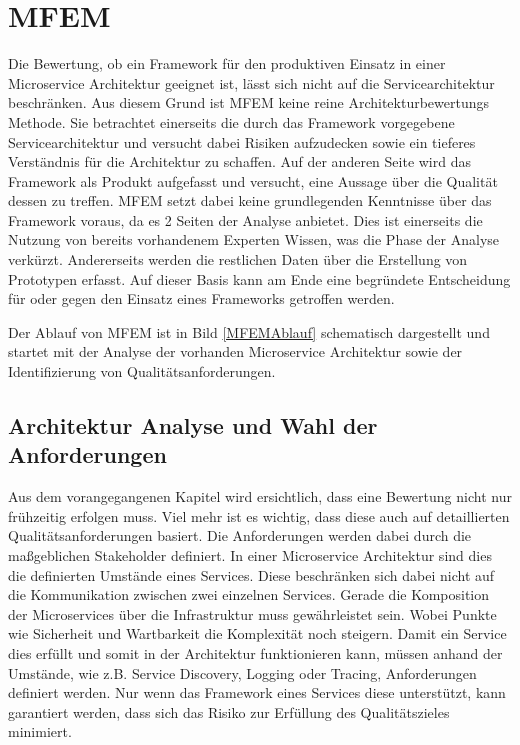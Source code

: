\section{\acf{MFEM}}

Die Bewertung, ob ein Framework für den produktiven Einsatz in einer Microservice Architektur geeignet ist, lässt sich nicht auf die Servicearchitektur beschränken. Aus diesem Grund ist \ac{MFEM} keine reine Architekturbewertungs Methode. Sie betrachtet einerseits die durch das Framework vorgegebene Servicearchitektur und versucht dabei Risiken aufzudecken sowie ein tieferes Verständnis für die Architektur zu schaffen. Auf der anderen Seite wird das Framework als Produkt aufgefasst und versucht, eine Aussage über die Qualität dessen zu treffen. \ac{MFEM} setzt dabei keine grundlegenden Kenntnisse über das Framework voraus, da es 2 Seiten der Analyse anbietet. Dies ist einerseits die Nutzung von bereits vorhandenem Experten Wissen, was die Phase der Analyse verkürzt. Andererseits werden die restlichen Daten über die Erstellung von Prototypen erfasst.
Auf dieser Basis kann am Ende eine begründete Entscheidung für oder gegen den Einsatz eines Frameworks getroffen werden.

Der Ablauf von \ac{MFEM} ist in Bild \ref{MFEMAblauf} schematisch dargestellt und startet mit der Analyse der vorhanden Microservice Architektur sowie der Identifizierung von Qualitätsanforderungen.


\subsection{Architektur Analyse und Wahl der Anforderungen}

Aus dem vorangegangenen Kapitel wird ersichtlich, dass eine Bewertung nicht nur frühzeitig erfolgen muss. Viel mehr ist es wichtig, dass diese auch auf detaillierten Qualitätsanforderungen basiert. Die Anforderungen werden dabei durch die maßgeblichen Stakeholder definiert. In einer Microservice Architektur sind dies die definierten Umstände eines Services. Diese beschränken sich dabei nicht auf die Kommunikation zwischen zwei einzelnen Services. Gerade die Komposition der Microservices über die Infrastruktur muss gewährleistet sein. Wobei Punkte wie Sicherheit und Wartbarkeit die Komplexität noch steigern.
Damit ein Service dies erfüllt und somit in der Architektur funktionieren kann, müssen anhand der Umstände, wie z.B. Service Discovery, Logging oder Tracing, Anforderungen definiert werden. Nur wenn das Framework eines Services diese unterstützt, kann garantiert werden, dass sich das Risiko zur Erfüllung des Qualitätszieles minimiert.

